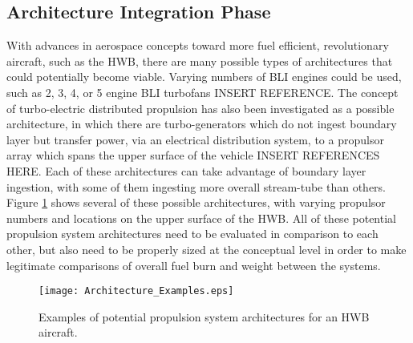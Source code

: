 		\subsection{Architecture Integration Phase}
			With advances in aerospace concepts toward more fuel efficient, revolutionary aircraft, such as the HWB, there are many possible types of architectures that could potentially become viable.  Varying numbers of BLI engines could be used, such as 2, 3, 4, or 5 engine BLI turbofans INSERT REFERENCE.  The concept of turbo-electric distributed propulsion has also been investigated as a possible architecture, in which there are turbo-generators which do not ingest boundary layer but transfer power, via an electrical distribution system, to a propulsor array which spans the upper surface of the vehicle INSERT REFERENCES HERE.  Each of these architectures can take advantage of boundary layer ingestion, with some of them ingesting more overall stream-tube than others.  Figure \ref{Architecture_Examples} shows several of these possible architectures, with varying propulsor numbers and locations on the upper surface of the HWB.  All of these potential propulsion system architectures need to be evaluated in comparison to each other, but also need to be properly sized at the conceptual level in order to make legitimate comparisons of overall fuel burn and weight between the systems.  
			\begin{figure}[htp]
				\centering
				\texttt{[image: Architecture\_Examples.eps]}
				\caption{Examples of potential propulsion system architectures for an HWB aircraft.}
				\label{Architecture_Examples}
			\end{figure}		
		
